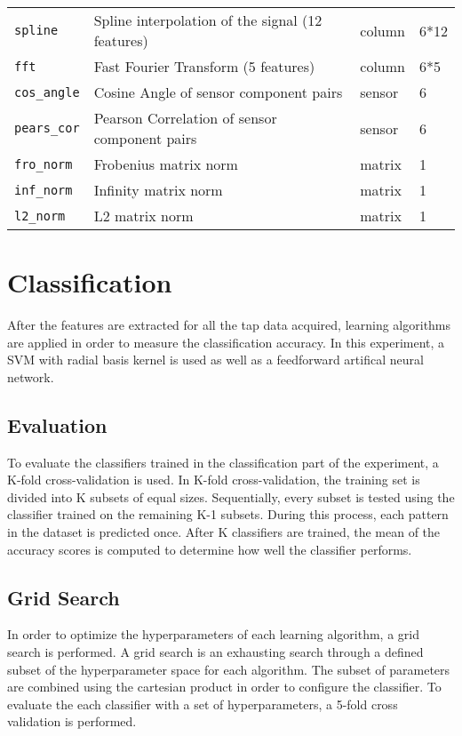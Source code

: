 \begin{center}
\begin{tabular}{ | l| l | l | l |}
    \texttt{spline} & Spline interpolation of the signal (12 features) & column  & 6*12 \\
    \texttt{fft} & Fast Fourier Transform (5 features) & column  & 6*5 \\
  \hline
    \texttt{cos\_angle} & Cosine Angle of sensor component pairs & sensor & 6 \\
    \texttt{pears\_cor} & Pearson Correlation of sensor component pairs & sensor & 6 \\
  \hline
    \texttt{fro\_norm} & Frobenius matrix norm & matrix & 1 \\
    \texttt{inf\_norm} & Infinity matrix norm & matrix & 1 \\
    \texttt{l2\_norm} & L2 matrix norm & matrix & 1 \\
  \hline
  \end{tabular}
  \label{table:features}
\end{center}

\section{Classification}
After the features are extracted for all the tap data acquired, learning algorithms are applied in order to measure the classification accuracy. In this experiment, a SVM with radial basis kernel is used as well as a feedforward artifical neural network.

\subsection{Evaluation}
To evaluate the classifiers trained in the classification part of the experiment, a K-fold cross-validation is used. In K-fold cross-validation, the training set is divided into K subsets of equal sizes. Sequentially, every subset is tested using the classifier trained on the remaining K-1 subsets. During this process, each pattern in the dataset is predicted once. After K classifiers are trained, the mean of the accuracy scores is computed to determine how well the classifier performs.

\subsection{Grid Search}
In order to optimize the hyperparameters of each learning algorithm, a grid search is performed. A grid search is an exhausting search through a defined subset of the hyperparameter space for each algorithm. The subset of parameters are combined using the cartesian product in order to configure the classifier. To evaluate the each classifier with a set of hyperparameters, a 5-fold cross validation is performed.

